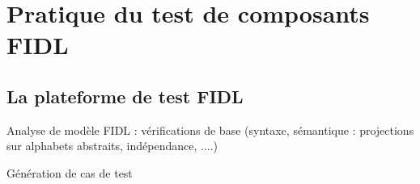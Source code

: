 \section{Pratique du test de composants \textsf{FIDL}}

\subsection{La plateforme de test \textsf{FIDL}}

Analyse de mod\`ele FIDL : v\'erifications  de base (syntaxe,
s\'emantique : projections sur alphabets abstraits, ind\'ependance,
....)

G\'en\'eration de cas de test


  